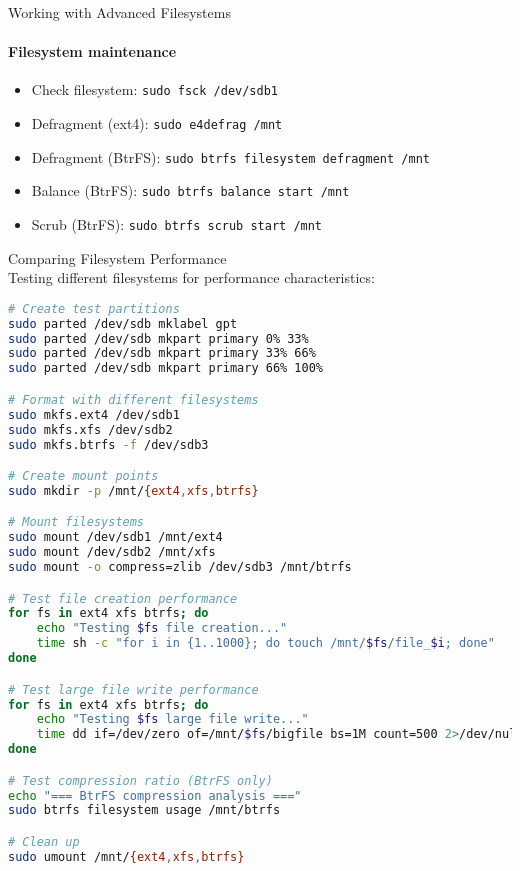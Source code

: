 \begin{KR}{Working with Advanced Filesystems}
    \paragraph{Filesystem maintenance}
    \begin{itemize}
        \item Check filesystem: \texttt{sudo fsck /dev/sdb1}
        \item Defragment (ext4): \texttt{sudo e4defrag /mnt}
        \item Defragment (BtrFS): \texttt{sudo btrfs filesystem defragment /mnt}
        \item Balance (BtrFS): \texttt{sudo btrfs balance start /mnt}
        \item Scrub (BtrFS): \texttt{sudo btrfs scrub start /mnt}
    \end{itemize}
\end{KR}

\begin{example2}{Comparing Filesystem Performance}\\
    Testing different filesystems for performance characteristics:
    
\begin{lstlisting}[language=bash, style=basesmol]
# Create test partitions
sudo parted /dev/sdb mklabel gpt
sudo parted /dev/sdb mkpart primary 0% 33%
sudo parted /dev/sdb mkpart primary 33% 66%
sudo parted /dev/sdb mkpart primary 66% 100%

# Format with different filesystems
sudo mkfs.ext4 /dev/sdb1
sudo mkfs.xfs /dev/sdb2
sudo mkfs.btrfs -f /dev/sdb3

# Create mount points
sudo mkdir -p /mnt/{ext4,xfs,btrfs}

# Mount filesystems
sudo mount /dev/sdb1 /mnt/ext4
sudo mount /dev/sdb2 /mnt/xfs
sudo mount -o compress=zlib /dev/sdb3 /mnt/btrfs

# Test file creation performance
for fs in ext4 xfs btrfs; do
    echo "Testing $fs file creation..."
    time sh -c "for i in {1..1000}; do touch /mnt/$fs/file_$i; done"
done

# Test large file write performance
for fs in ext4 xfs btrfs; do
    echo "Testing $fs large file write..."
    time dd if=/dev/zero of=/mnt/$fs/bigfile bs=1M count=500 2>/dev/null
done

# Test compression ratio (BtrFS only)
echo "=== BtrFS compression analysis ==="
sudo btrfs filesystem usage /mnt/btrfs

# Clean up
sudo umount /mnt/{ext4,xfs,btrfs}
\end{lstlisting}
\end{example2}

